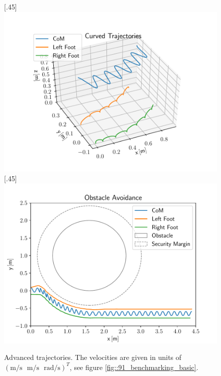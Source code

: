 \begin{figure}[h!]
	\centering
	[.45\linewidth]{\includegraphics[scale=.45]{chapters/09_user_controlled_walking_experiments/img/01_benchmarking/nmpc_turn.pdf}}
	[.45\linewidth]{\includegraphics[scale=.45]{chapters/09_user_controlled_walking_experiments/img/01_benchmarking/nmpc_obstacle.pdf}}
	\caption{Advanced trajectories. The velocities are given in units of\\$(\text{m}/\text{s}\,\,\,\,\text{m}/\text{s}\,\,\,\,\text{rad}/\text{s})^T$, see figure \ref{fig::91_benchmarking_basic}.}
	\label{fig::91_benchmarking_advanced}
\end{figure} 
